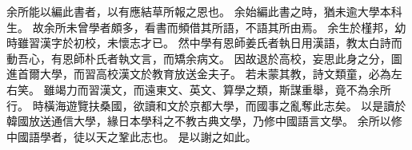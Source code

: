 余所能以編此書者，以有應結草所報之恩也。
余始編此書之時，猶未逾大學本科生。
故余所未曾學者頗多，看書而頻借其所語，不語其所由焉。
余生於槿邦，幼時雖習漢字於初校，未懷志才已。
然中學有恩師姜氏者執日用漢語，教太白詩而動吾心，有恩師朴氏者執文言，而矯余病文。
因故退於高校，妄思此身之分，圖進首爾大學，而習高校漢文於教育放送金夫子。
若未蒙其教，詩文類童，必為左右笑。
雖竭力而習漢文，而遠東文、英文、算學之類，斯謀重舉，竟不為余所行。
時橫海遊覽扶桑國，欲讀和文於京都大學，而國事之亂奪此志矣。
以是讀於韓國放送通信大學，緣日本學科之不教古典文學，乃修中國語言文學。
余所以修中國語學者，徒以天之鞏此志也。
是以謝之如此。